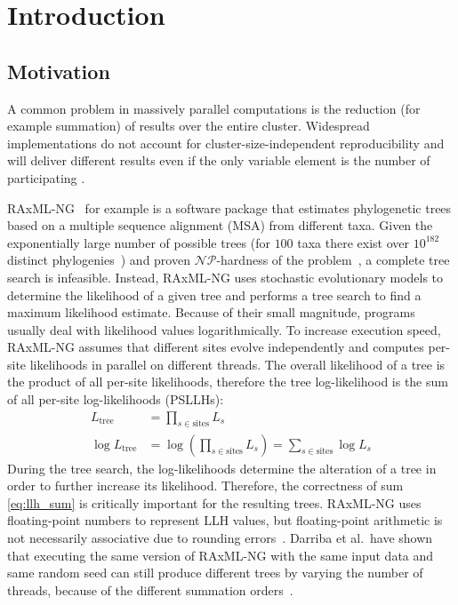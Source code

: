 \chapter{Introduction}
\label{ch:Introduction}

\section{Motivation}
\label{sec:Motivation}
A common problem in massively parallel computations is the reduction (for example summation) of results over the entire cluster.
Widespread implementations do not account for cluster-size-independent reproducibility and will deliver different results
even if the only variable element is the number of participating .

RAxML-NG~\cite{kozlov_raxml-ng_2019} for example is a software package that estimates phylogenetic trees based on a multiple sequence alignment (MSA) from different taxa.
Given the exponentially large number of possible trees (for $100$ taxa there exist over $10^{182}$ distinct phylogenies~\cite{stamatakis_efficient_2020}) and proven $\mathcal{NP}$-hardness of the problem~\cite{roch_short_2006}, a complete tree search is infeasible.
Instead, RAxML-NG uses stochastic evolutionary models to determine the likelihood of a given tree and performs a tree search to find a maximum likelihood estimate.
Because of their small magnitude, programs usually deal with likelihood values logarithmically.
To increase execution speed, RAxML-NG assumes that different sites evolve independently and computes per-site likelihoods in parallel on different threads.
The overall likelihood of a tree is the product of all per-site likelihoods, therefore the tree log-likelihood is the sum of all per-site log-likelihoods (PSLLHs):
\begin{align}
L_{\textrm{tree}} &= \prod_{s \in \textrm{sites}} L_s \\
\label{eq:llh_sum}
\log L_{\textrm{tree}} &= \log (\prod_{s \in \textrm{sites}} L_s) = \sum_{s \in \textrm{sites}}  \log L_s
\end{align}
During the tree search, the log-likelihoods determine the alteration of a tree in order to further increase its likelihood.
Therefore, the correctness of sum \eqref{eq:llh_sum} is critically important for the resulting trees.
RAxML-NG uses floating-point numbers to represent LLH values, but floating-point arithmetic is not necessarily associative due to rounding errors~\cite{goldberg_what_1991}.
Darriba et al.\ have shown that executing the same version of RAxML-NG with the same input data and same random seed can still produce different trees by varying the number of threads, because of the different summation orders~\cite{darriba_state_2018}.

